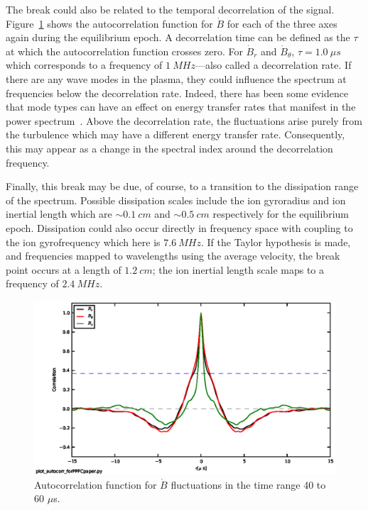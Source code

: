 \documentclass[12pt]{iopart}
\begin{document}
The break could also be related to the temporal decorrelation of the signal. Figure~\ref{fig:autocorr} shows the autocorrelation function for $\dot{B}$ for each of the three axes again during the equilibrium epoch. A decorrelation time can be defined as the $\tau$ at which the autocorrelation function crosses zero. For $\dot{B}_{r}$ and $\dot{B}_{\theta}$, $\tau = 1.0~\mu s$ which corresponds to a frequency of $1~MHz$---also called a decorrelation rate. If there are any wave modes in the plasma, they could influence the spectrum at frequencies below the decorrelation rate. Indeed, there has been some evidence that mode types can have an effect on energy transfer rates that manifest in the power spectrum~\cite{shaikh09}. Above the decorrelation rate, the fluctuations arise purely from the turbulence which may have a different energy transfer rate. Consequently, this may appear as a change in the spectral index around the decorrelation frequency.

Finally, this break may be due, of course, to a transition to the dissipation range of the spectrum. Possible dissipation scales include the ion gyroradius and ion inertial length which are $\sim 0.1~cm$ and $\sim 0.5~cm$ respectively for the equilibrium epoch. Dissipation could also occur directly in frequency space with coupling to the ion gyrofrequency which here is $7.6~MHz$. If the Taylor hypothesis is made, and frequencies mapped to wavelengths using the average velocity, the break point occurs at a length of $1.2~cm$; the ion inertial length scale maps to a frequency of $2.4~MHz$.

\begin{figure}[!htbp]
\centerline{
\includegraphics[width=16cm]{autocorr.eps}}
\caption{\label{fig:autocorr} Autocorrelation function for $\dot{B}$ fluctuations in the time range 40 to 60 $\mu$s.}
\end{figure}
\end{document}
